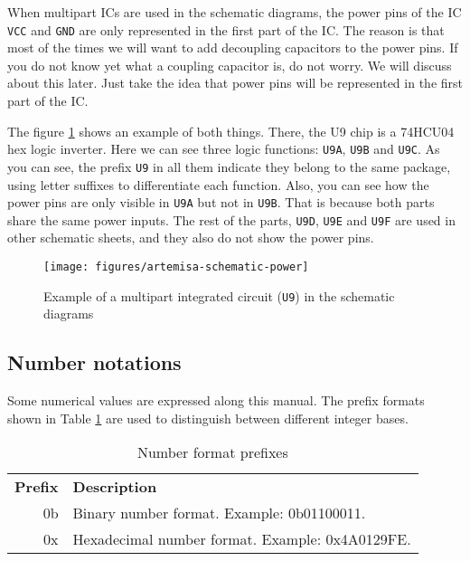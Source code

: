 When multipart ICs are used in the schematic diagrams, the power pins of the IC {\tt VCC} and {\tt GND} are only represented in the first part of the IC. The reason is that most of the times we will want to add decoupling capacitors to the power pins. If you do not know yet what a coupling capacitor is, do not worry. We will discuss about this later. Just take the idea that power pins will be represented in the first part of the IC.

The figure \ref{fig:schematic-multipart-ics} shows an example of both things. There, the U9 chip is a 74HCU04 hex logic inverter. Here we can see three logic functions: {\tt U9A}, {\tt U9B} and {\tt U9C}. As you can see, the prefix {\tt U9} in all them indicate they belong to the same package, using letter suffixes to differentiate each function. Also, you can see how the power pins are only visible in {\tt U9A} but not in {\tt U9B}. That is because both parts share the same power inputs. The rest of the parts, {\tt U9D}, {\tt U9E} and {\tt U9F} are used in other schematic sheets, and they also do not show the power pins.

\begin{figure}[h]
	\centering
	\texttt{[image: figures/artemisa-schematic-power]}
	\caption{Example of a multipart integrated circuit ({\tt U9}) in the schematic diagrams}
	\label{fig:schematic-multipart-ics}
\end{figure}


\subsection{Number notations}

Some numerical values are expressed along this manual. The prefix formats shown in Table \ref{table:number-formats} are used to distinguish between different integer bases. 

\begin{table}[h!]
	\centering
	\begin{tabular}{ r|l }
		{\bf Prefix} & {\bf Description}                               \\
		0b           & Binary number format. Example: 0b01100011.      \\
		0x           & Hexadecimal number format. Example: 0x4A0129FE. \\
	\end{tabular}
	\caption{Number format prefixes}
	\label{table:number-formats}
\end{table}

